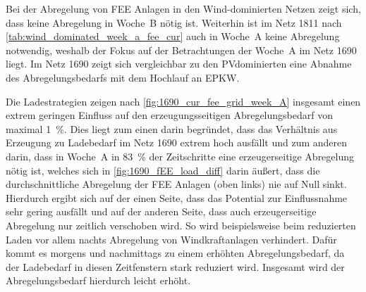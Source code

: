

Bei der Abregelung von \gls{FEE} Anlagen in den Wind-dominierten Netzen zeigt sich, dass keine Abregelung in Woche~B nötig ist.
Weiterhin ist im Netz \num{1811} nach \autoref{tab:wind_dominated_week_a_fee_cur} auch in Woche~A keine Abregelung notwendig, weshalb der Fokus auf der Betrachtungen der Woche~A im Netz \num{1690} liegt.
Im Netz \num{1690} zeigt sich vergleichbar zu den \gls{PV}dominierten eine Abnahme des Abregelungsbedarfs mit dem Hochlauf an \gls{EPKW}.\medskip

Die Ladestrategien zeigen nach \autoref{fig:1690_cur_fee_grid_week_A} insgesamt einen extrem geringen Einfluss auf den erzeugungsseitigen Abregelungsbedarf von maximal \SI{1}{\percent}.
Dies liegt zum einen darin begründet, dass das Verhältnis aus Erzeugung zu Ladebedarf im Netz \num{1690} extrem hoch ausfällt und zum anderen darin, dass in Woche~A in \SI{83}{\percent} der Zeitschritte eine erzeugerseitige Abregelung nötig ist, welches sich in \autoref{fig:1690_fEE_load_diff} darin äußert, dass die durchschnittliche Abregelung der \gls{FEE} Anlagen (oben links) nie auf Null sinkt.
Hierdurch ergibt sich auf der einen Seite, dass das Potential zur Einflussnahme sehr gering ausfällt und auf der anderen Seite, dass auch erzeugerseitige Abregelung nur zeitlich verschoben wird.
So wird beispielsweise beim reduzierten Laden vor allem nachts Abregelung von Windkraftanlagen verhindert.
Dafür kommt es morgens und nachmittags zu einem erhöhten Abregelungsbedarf, da der Ladebedarf in diesen Zeitfenstern stark reduziert wird.
Insgesamt wird der Abregelungsbedarf hierdurch leicht erhöht.



